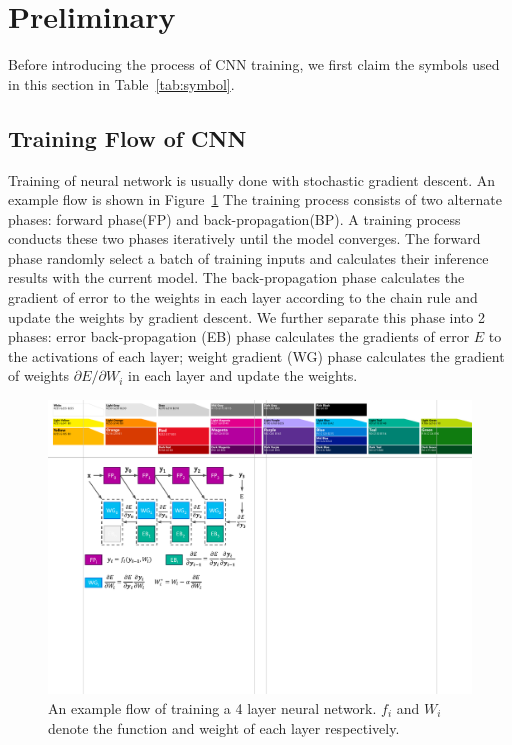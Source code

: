 \section{Preliminary}\label{sec:preliminary}
Before introducing the process of CNN training, we first claim the symbols used in this section in Table~\ref{tab:symbol}.



\subsection{Training Flow of CNN}
Training of neural network is usually done with stochastic gradient descent. An example flow is shown in Figure~\ref{fig:train_prelim} The training process consists of two alternate phases: forward phase(FP) and back-propagation(BP). A training process conducts these two phases iteratively until the model converges. The forward phase randomly select a batch of training inputs and calculates their inference results with the current model. The back-propagation phase calculates the gradient of error to the weights in each layer according to the chain rule and update the weights by gradient descent. We further separate this phase into 2 phases: error back-propagation (EB) phase calculates the gradients of error $E$ to the activations of each layer; weight gradient (WG) phase calculates the gradient of weights $\partial E/\partial W_i$ in each layer and update the weights. 

\begin{figure}[t]
  \centering
  \includegraphics[width=0.9\columnwidth]{figures/train_prelim.pdf}
  \caption{An example flow of training a 4 layer neural network. $f_i$ and $W_i$ denote the function and weight of each layer respectively.}
  \label{fig:train_prelim}
\end{figure}

